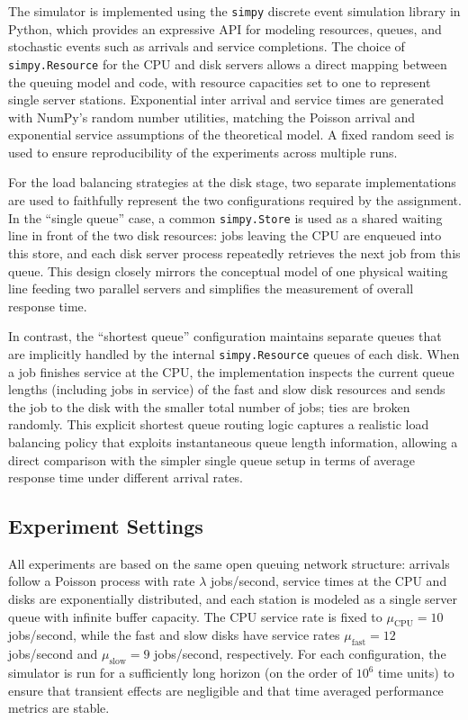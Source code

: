 \documentclass[a4paper,10pt]{article}
\begin{document}
The simulator is implemented using the \texttt{simpy} discrete event simulation library in Python, which provides an expressive API for modeling resources, queues, and stochastic events such as arrivals and service completions. The choice of \texttt{simpy.Resource} for the CPU and disk servers allows a direct mapping between the queuing model and code, with resource capacities set to one to represent single server stations. Exponential inter arrival and service times are generated with NumPy’s random number utilities, matching the Poisson arrival and exponential service assumptions of the theoretical model. A fixed random seed is used to ensure reproducibility of the experiments across multiple runs. 

For the load balancing strategies at the disk stage, two separate implementations are used to faithfully represent the two configurations required by the assignment. In the ``single queue'' case, a common \texttt{simpy.Store} is used as a shared waiting line in front of the two disk resources: jobs leaving the CPU are enqueued into this store, and each disk server process repeatedly retrieves the next job from this queue. This design closely mirrors the conceptual model of one physical waiting line feeding two parallel servers and simplifies the measurement of overall response time.

In contrast, the ``shortest queue'' configuration maintains separate queues that are implicitly handled by the internal \texttt{simpy.Resource} queues of each disk. When a job finishes service at the CPU, the implementation inspects the current queue lengths (including jobs in service) of the fast and slow disk resources and sends the job to the disk with the smaller total number of jobs; ties are broken randomly. This explicit shortest queue routing logic captures a realistic load balancing policy that exploits instantaneous queue length information, allowing a direct comparison with the simpler single queue setup in terms of average response time under different arrival rates. 
\subsection{Experiment Settings}

All experiments are based on the same open queuing network structure: arrivals follow a Poisson process with rate $\lambda$ jobs/second, service times at the CPU and disks are exponentially distributed, and each station is modeled as a single server queue with infinite buffer capacity. The CPU service rate is fixed to $\mu_{\text{CPU}} = 10$ jobs/second, while the fast and slow disks have service rates $\mu_{\text{fast}} = 12$ jobs/second and $\mu_{\text{slow}} = 9$ jobs/second, respectively. For each configuration, the simulator is run for a sufficiently long horizon (on the order of $10^6$ time units) to ensure that transient effects are negligible and that time averaged performance metrics are stable.
\end{document}
